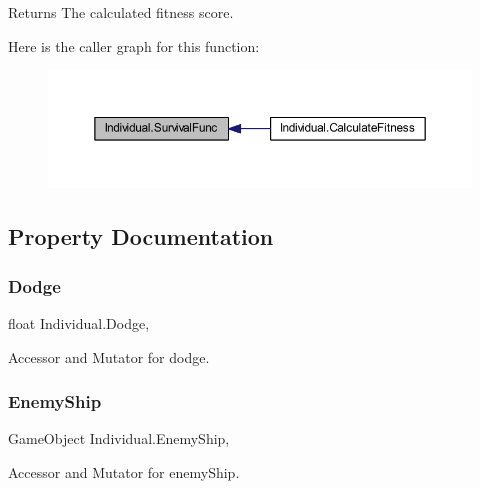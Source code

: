 \begin{DoxyReturn}{Returns}
The calculated fitness score.
\end{DoxyReturn}
Here is the caller graph for this function\+:\nopagebreak
\begin{figure}[H]
\begin{center}
\leavevmode
\includegraphics[width=350pt]{class_individual_abf304201269d32a0f40d9a25ce98d8db_icgraph}
\end{center}
\end{figure}


\subsection{Property Documentation}
\mbox{\label{class_individual_a8daea02958bdf86b68fc063556a12a56}} 
\subsubsection{\texorpdfstring{Dodge}{Dodge}}
{\footnotesize\ttfamily float Individual.\+Dodge\hspace{0.3cm}{\ttfamily [get]}, {\ttfamily [set]}}



Accessor and Mutator for dodge. 

\mbox{\label{class_individual_a473dd92ebe3c07db394d6bcd0bfcac93}} 
\subsubsection{\texorpdfstring{Enemy\+Ship}{EnemyShip}}
{\footnotesize\ttfamily Game\+Object Individual.\+Enemy\+Ship\hspace{0.3cm}{\ttfamily [get]}, {\ttfamily [set]}}



Accessor and Mutator for enemy\+Ship. 


